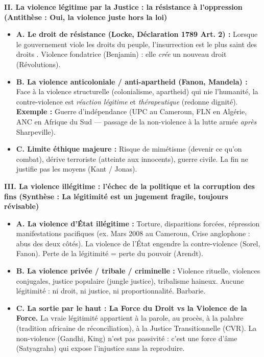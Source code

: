 \documentclass[11pt]{article}
\newcommand{\cle}[1]{{\popxbold\color{popdark}#1}}
\begin{document}
\begin{exoresolu}
\textbf{II. La violence légitime par la Justice : la résistance à l'oppression (Antithèse : Oui, la violence juste hors la loi)}
\begin{itemize}
    \item \textbf{A. Le droit de résistance (Locke, Déclaration 1789 Art. 2) :} \guillemotleft Lorsque le gouvernement viole les droits du peuple, l'insurrection est le plus saint des droits \guillemotright. Violence \cle{fondatrice} (Benjamin) : elle \emph{crée} un nouveau droit (Révolutions).
    \item \textbf{B. La violence anticoloniale / anti-apartheid (Fanon, Mandela) :} Face à la \cle{violence structurelle} (colonialisme, apartheid) qui nie l'humanité, la \cle{contre-violence} est \emph{réaction légitime} et \emph{thérapeutique} (redonne dignité). \textbf{Exemple :} Guerre d'indépendance (UPC au Cameroun, FLN en Algérie, ANC en Afrique du Sud — passage de la non-violence à la lutte armée \emph{après} Sharpeville).
    \item \textbf{C. Limite éthique majeure :} Risque de \cle{mimétisme} (devenir ce qu'on combat), dérive terroriste (atteinte aux innocents), guerre civile. \guillemotleft La fin ne justifie pas les moyens \guillemotright (Kant / Jonas).
\end{itemize}

\textbf{III. La violence illégitime : l'échec de la politique et la corruption des fins (Synthèse : La légitimité est un jugement fragile, toujours révisable)}
\begin{itemize}
    \item \textbf{A. La violence d'État illégitime :} Torture, disparitions forcées, répression manifestations pacifiques (ex. \cle{Mars 2008} au Cameroun, \cle{Crise anglophone} : abus des deux côtés). \guillemotleft La violence de l'État engendre la contre-violence \guillemotright (Sorel, Fanon). Perte de la \cle{légitimité} = perte du \cle{pouvoir} (Arendt).
    \item \textbf{B. La violence privée / tribale / criminelle :} Violence rituelle, violences conjugales, justice populaire (\cle{jungle justice}), tribalisme haineux. Aucune légitimité : ni droit, ni justice, ni proportionnalité. \cle{Barbarie}.
    \item \textbf{C. La sortie par le haut : La \cle{Force} du Droit vs la \cle{Violence} de la Force.} La vraie légitimité appartient à la \cle{parole}, au \cle{procès}, à la \cle{palabre} (tradition africaine de réconciliation), à la \cle{Justice Transitionnelle} (CVR). La non-violence (Gandhi, King) n'est pas passivité : c'est une \cle{force d'âme} (Satyagraha) qui expose l'injustice sans la reproduire.
\end{itemize}


\end{exoresolu}
\end{document}

